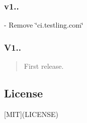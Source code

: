 \subsubsection*{v1..}


\begin{DoxyItemize}
\item -\/ Remove \char`\"{}ci.\+testling.\+com\char`\"{}
\end{DoxyItemize}

\subsubsection*{V1..}

\begin{quote}
First release. \end{quote}


\subsection*{License}

\mbox{[}M\+IT\mbox{]}(L\+I\+C\+E\+N\+SE) 